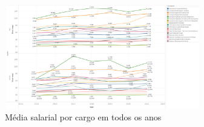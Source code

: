 \begin{figure}[htbp]
	\centerline{
		\includegraphics[width=85mm]{assets/5_sal_cbo_full.PNG}
	}
	\caption{Média salarial por cargo em todos os anos}
	\label{fig_5_sal_cbo_full}
\end{figure}




